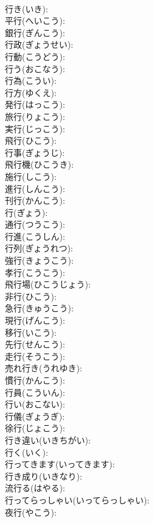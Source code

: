 \documentclass[8pt]{extreport}
\begin{document}
\begin{CJK}{UTF8}{min}
\\	行き(いき): 
\\	平行(へいこう): 
\\	銀行(ぎんこう): 
\\	行政(ぎょうせい): 
\\	行動(こうどう): 
\\	行う(おこなう): 
\\	行為(こうい): 
\\	行方(ゆくえ): 
\\	発行(はっこう): 
\\	旅行(りょこう): 
\\	実行(じっこう): 
\\	飛行(ひこう): 
\\	行事(ぎょうじ): 
\\	飛行機(ひこうき): 
\\	施行(しこう): 
\\	進行(しんこう): 
\\	刊行(かんこう): 
\\	行(ぎょう): 
\\	通行(つうこう): 
\\	行進(こうしん): 
\\	行列(ぎょうれつ): 
\\	強行(きょうこう): 
\\	孝行(こうこう): 
\\	飛行場(ひこうじょう): 
\\	非行(ひこう): 
\\	急行(きゅうこう): 
\\	現行(げんこう): 
\\	移行(いこう): 
\\	先行(せんこう): 
\\	走行(そうこう): 
\\	売れ行き(うれゆき): 
\\	慣行(かんこう): 
\\	行員(こういん): 
\\	行い(おこない): 
\\	行儀(ぎょうぎ): 
\\	徐行(じょこう): 
\\	行き違い(いきちがい): 
\\	行く(いく): 
\\	行ってきます(いってきます): 
\\	行き成り(いきなり): 
\\	流行る(はやる): 
\\	行ってらっしゃい(いってらっしゃい): 
\\	夜行(やこう): 

\end{CJK}
\end{document}

